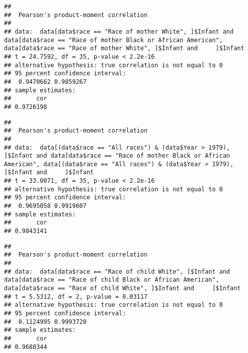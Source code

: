 \documentclass[]{article}
\newenvironment{Shaded}{\begin{snugshade}}{\end{snugshade}}
\newcommand{\DecValTok}[1]{\textcolor[rgb]{0.00,0.00,0.81}{#1}}
\newcommand{\KeywordTok}[1]{\textcolor[rgb]{0.13,0.29,0.53}{\textbf{#1}}}
\newcommand{\NormalTok}[1]{#1}
\newcommand{\OperatorTok}[1]{\textcolor[rgb]{0.81,0.36,0.00}{\textbf{#1}}}
\newcommand{\StringTok}[1]{\textcolor[rgb]{0.31,0.60,0.02}{#1}}
\begin{document}
\begin{verbatim}
## 
##  Pearson's product-moment correlation
## 
## data:  data[data$race == "Race of mother White", ]$Infant and data[data$race == "Race of mother Black or African American", data[data$race == "Race of mother White", ]$Infant and     ]$Infant
## t = 24.7592, df = 35, p-value < 2.2e-16
## alternative hypothesis: true correlation is not equal to 0
## 95 percent confidence interval:
##  0.9470662 0.9859267
## sample estimates:
##       cor 
## 0.9726198
\end{verbatim}

\begin{Shaded}
\end{Shaded}

\begin{verbatim}
## 
##  Pearson's product-moment correlation
## 
## data:  data[(data$race == "All races") & (data$Year > 1979), ]$Infant and data[data$race == "Race of mother Black or African American", data[(data$race == "All races") & (data$Year > 1979), ]$Infant and     ]$Infant
## t = 33.0071, df = 35, p-value < 2.2e-16
## alternative hypothesis: true correlation is not equal to 0
## 95 percent confidence interval:
##  0.9695058 0.9919607
## sample estimates:
##       cor 
## 0.9843141
\end{verbatim}

\begin{Shaded}
\end{Shaded}

\begin{verbatim}
## 
##  Pearson's product-moment correlation
## 
## data:  data[data$race == "Race of child White", ]$Infant and data[data$race == "Race of child Black or African American", data[data$race == "Race of child White", ]$Infant and     ]$Infant
## t = 5.5312, df = 2, p-value = 0.03117
## alternative hypothesis: true correlation is not equal to 0
## 95 percent confidence interval:
##  0.1124995 0.9993720
## sample estimates:
##       cor 
## 0.9688344
\end{verbatim}
\end{document}

